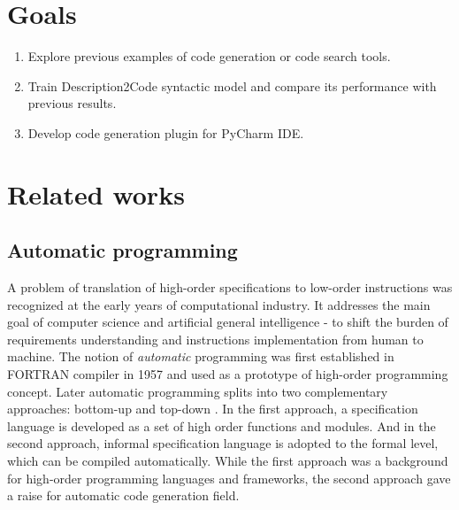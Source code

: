 

\section{Goals}

\begin{enumerate}
	\item Explore previous examples of code generation or code search tools.
	\item Train Description2Code syntactic model and compare its performance with previous results.
	\item Develop code generation plugin for PyCharm IDE.
\end{enumerate}


\section{Related works}

\subsection{Automatic programming}

A problem of translation of high-order specifications to low-order instructions was recognized at the early years of computational industry. It addresses the main goal of computer science and artificial general intelligence - to shift the burden of requirements understanding and instructions implementation from human to machine. The notion of \emph{automatic} programming was first established in FORTRAN compiler in 1957 \parencite{backus1957fortran} and used as a prototype of high-order programming concept.  Later automatic programming splits into two complementary approaches: bottom-up and top-down \parencite{Balzer1985}. In the first approach, a specification language is developed as a set of high order functions and modules. And in the second approach, informal specification language is adopted to the formal level, which can be compiled automatically. While the first approach was a background for high-order programming languages and frameworks, the second approach gave a raise for automatic code generation field. 

